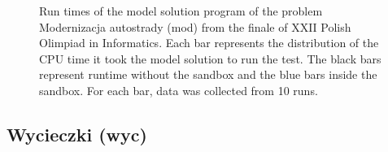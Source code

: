 \documentclass[en]{pracamgr}
\begin{document}
\begin{appendices}
\begin{figure}[H]
\caption{Run times of the model solution program of the problem Modernizacja autostrady (mod) from the finale of XXII Polish Olimpiad in Informatics. Each bar represents the distribution of the CPU time it took the model solution to run the test. The black bars represent runtime without the sandbox and the blue bars inside the sandbox. For each bar, data was collected from 10 runs.}
\label{figure:mod_model_solution_cpu_time}
\end{figure}

\subsection{Wycieczki (wyc)}


\end{appendices}
\end{document}
